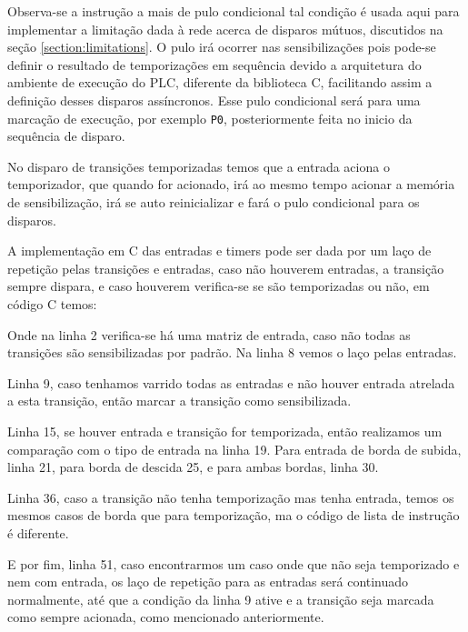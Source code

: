 Observa-se a instrução a mais de pulo condicional tal condição é usada aqui para implementar a limitação dada à rede acerca de disparos mútuos, discutidos na seção \ref{section:limitations}. O pulo irá ocorrer nas sensibilizações pois pode-se definir o resultado de temporizações em sequência devido a arquitetura do ambiente de execução do PLC, diferente da biblioteca C, facilitando assim a definição desses disparos assíncronos. Esse pulo condicional será para uma marcação de execução, por exemplo \lstinline{P0}, posteriormente feita no inicio da sequência de disparo.  



No disparo de transições temporizadas temos que a entrada aciona o temporizador, que quando for acionado, irá ao mesmo tempo acionar a memória de sensibilização, irá se auto reinicializar e fará o pulo condicional para os disparos.   

A implementação em C das entradas e timers pode ser dada por um laço de repetição pelas transições e entradas, caso não houverem entradas, a transição sempre dispara, e caso houverem verifica-se se são temporizadas ou não, em código C temos: 



Onde na linha 2 verifica-se há uma matriz de entrada, caso não todas as transições são sensibilizadas por padrão. Na linha 8 vemos o laço pelas entradas.

Linha 9, caso tenhamos varrido todas as entradas e não houver entrada atrelada a esta transição, então marcar a transição como sensibilizada. 

Linha 15, se houver entrada e transição for temporizada, então realizamos um comparação com o tipo de entrada na linha 19. Para entrada de borda de subida, linha 21, para borda de descida 25, e para ambas bordas, linha 30.

Linha 36, caso a transição não tenha temporização mas tenha entrada, temos os mesmos casos de borda que para temporização, ma o código de lista de instrução é diferente.

E por fim, linha 51, caso encontrarmos um caso onde que não seja temporizado e nem com entrada, os laço de repetição para as entradas será continuado normalmente, até que a condição da linha 9 ative e a transição seja marcada como sempre acionada, como mencionado anteriormente.

